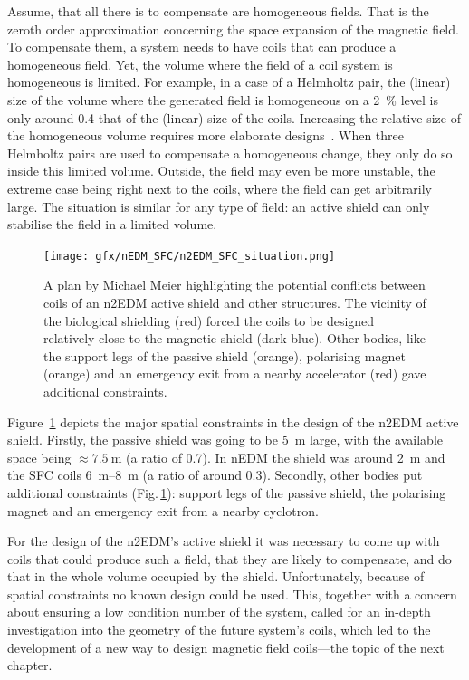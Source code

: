  Assume, that all there is to compensate are homogeneous fields. That is the zeroth order approximation concerning the space expansion of the magnetic field. To compensate them, a system needs to have coils that can produce a homogeneous field. Yet, the volume where the field of a coil system is homogeneous is limited. For example, in a case of a Helmholtz pair, the (linear) size of the volume where the generated field is homogeneous on a \SI{2}{\percent} level is only around \num{0.4} that of the (linear) size of the coils. Increasing the relative size of the homogeneous volume requires more elaborate designs~\cite{Kirschvink1992}. When three Helmholtz pairs are used to compensate a homogeneous change, they only do so inside this limited volume. Outside, the field may even be more unstable, the extreme case being right next to the coils, where the field can get arbitrarily large. The situation is similar for any type of field: an active shield can only stabilise the field in a limited volume.

\begin{figure}
  \centering
  \texttt{[image: gfx/nEDM\_SFC/n2EDM\_SFC\_situation.png]}
  \caption{A plan by Michael Meier highlighting the potential conflicts between coils of an n2EDM active shield and other structures. The vicinity of the biological shielding (red) forced the coils to be designed relatively close to the magnetic shield (dark blue). Other bodies, like the support legs of the passive shield (orange), polarising magnet (orange) and an emergency exit from a nearby accelerator (red) gave additional constraints.}\label{fig:n2EDM_sfc_situational_plan}
\end{figure}

Figure~\ref{fig:n2EDM_sfc_situational_plan} depicts the major spatial constraints in the design of the n2EDM active shield. Firstly, the passive shield was going to be \SI{5}{\metre} large, with the available space being $\approx \SI{7.5}{\metre}$ (a ratio of \num{0.7}). In nEDM the shield was around \SI{2}{\meter} and the SFC coils \SIrange[range-phrase = --, range-units=single]{6}{8}{\meter} (a ratio of around \num{0.3}). Secondly, other bodies put additional constraints (Fig.\,\ref{fig:n2EDM_sfc_situational_plan}): support legs of the passive shield, the polarising magnet and an emergency exit from a nearby cyclotron.

For the design of the n2EDM's active shield it was necessary to come up with coils that could produce such a field, that they are likely to compensate, and do that in the whole volume occupied by the shield. Unfortunately, because of spatial constraints no known design could be used. This, together with a concern about ensuring a low condition number of the system, called for an in-depth investigation into the geometry of the future system's coils, which led to the development of a new way to design magnetic field coils---the topic of the next chapter.


